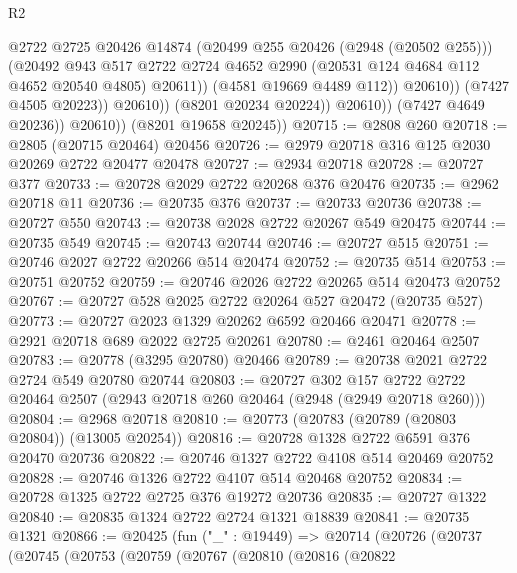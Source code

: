 \begin{lexlean}{R2}
\begin{coremodule}
                                @2722
                                @2725
                                @20426
                                @14874
                                (@20499 @255 @20426 (@2948 (@20502 @255)))
                                (@20492
                                  @943
                                  @517
                                  @2722
                                  @2724
                                  @4652
                                  @2990
                                  (@20531 @124 @4684 @112 @4652 @20540 @4805)
                                  @20611))
                              (@4581 @19669 @4489 @112))
                            @20610))
                        (@7427 @4505 @20223))
                      @20610))
                  (@8201 @20234 @20224))
                @20610))
            (@7427 @4649 @20236))
          @20610))
      (@8201 @19658 @20245))
@20715 := @2808 @260
@20718 := @2805 (@20715 @20464) @20456
@20726 := @2979 @20718 @316 @125 @2030 @20269 @2722 @20477 @20478
@20727 := @2934 @20718
@20728 := @20727 @377
@20733 := @20728 @2029 @2722 @20268 @376 @20476
@20735 := @2962 @20718 @11
@20736 := @20735 @376
@20737 := @20733 @20736
@20738 := @20727 @550
@20743 := @20738 @2028 @2722 @20267 @549 @20475
@20744 := @20735 @549
@20745 := @20743 @20744
@20746 := @20727 @515
@20751 := @20746 @2027 @2722 @20266 @514 @20474
@20752 := @20735 @514
@20753 := @20751 @20752
@20759 := @20746 @2026 @2722 @20265 @514 @20473 @20752
@20767 := @20727 @528 @2025 @2722 @20264 @527 @20472 (@20735 @527)
@20773 := @20727 @2023 @1329 @20262 @6592 @20466 @20471
@20778 := @2921 @20718 @689 @2022 @2725 @20261
@20780 := @2461 @20464 @2507
@20783 := @20778 (@3295 @20780) @20466
@20789 := @20738 @2021 @2722 @2724 @549 @20780 @20744
@20803 := @20727
    @302
    @157
    @2722
    @2722
    @20464
    @2507
    (@2943 @20718 @260 @20464 (@2948 (@2949 @20718 @260)))
@20804 := @2968 @20718
@20810 := @20773 (@20783 (@20789 (@20803 @20804)) (@13005 @20254))
@20816 := @20728 @1328 @2722 @6591 @376 @20470 @20736
@20822 := @20746 @1327 @2722 @4108 @514 @20469 @20752
@20828 := @20746 @1326 @2722 @4107 @514 @20468 @20752
@20834 := @20728 @1325 @2722 @2725 @376 @19272 @20736
@20835 := @20727 @1322
@20840 := @20835 @1324 @2722 @2724 @1321 @18839
@20841 := @20735 @1321
@20866 := @20425
    (fun ("_" : @19449) =>
    @20714
      (@20726
        (@20737
          (@20745
            (@20753
              (@20759
                (@20767
                  (@20810
                    (@20816
                      (@20822

\end{coremodule}
\end{lexlean}
